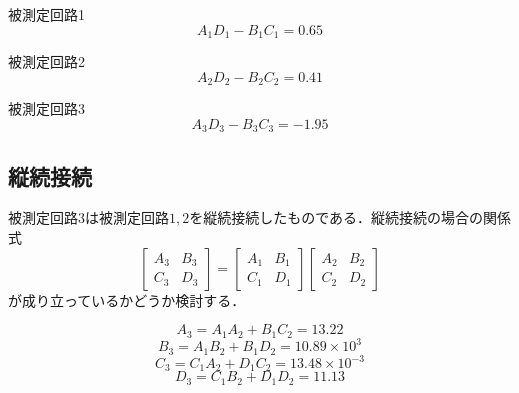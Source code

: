 \begin{description}
    \item 被測定回路1
    $$
    A_1D_1-B_1C_1=0.65
    $$
    
    \item 被測定回路2
    $$
    A_2D_2-B_2C_2=0.41
    $$
    
    \item 被測定回路3
    $$
    A_3D_3-B_3C_3=-1.95
    $$
    
\end{description}

\subsection{縦続接続}
被測定回路3は被測定回路$1,2$を縦続接続したものである．縦続接続の場合の関係式
$$
\left[\begin{array}{ll}
A_3 & B_3 \\
C_3 & D_3
\end{array}\right]=\left[\begin{array}{ll}
A_1 & B_1 \\
C_1 & D_1
\end{array}\right]\left[\begin{array}{cc}
A_2 & B_2 \\
C_2 & D_2
\end{array}\right]
$$
が成り立っているかどうか検討する．

$$
A_3=A_1A_2+B_1C_2=13.22
$$
$$
B_3=A_1B_2+B_1D_2=10.89\times10^3
$$
$$
C_3=C_1A_2+D_1C_2=13.48\times10^{-3}
$$
$$
D_3=C_1B_2+D_1D_2=11.13
$$

